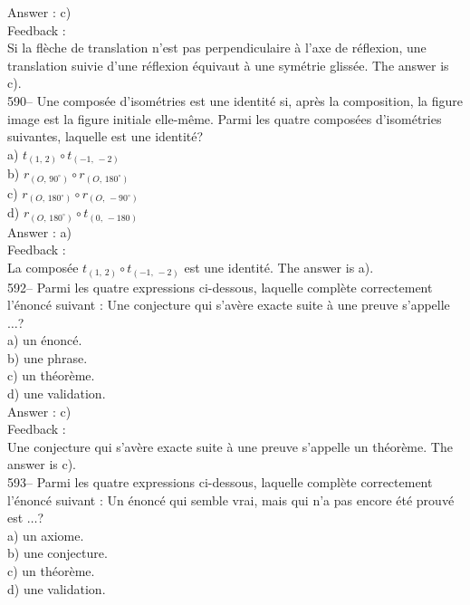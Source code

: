 ﻿\documentclass[letterpaper, 12pt]{article}
\begin{document}
Answer : c)\\

Feedback : \\
Si la fl\`eche de translation n'est pas perpendiculaire \`a l'axe de
r\'eflexion, une translation suivie d'une r\'eflexion  \'equivaut \`a une
sym\'etrie gliss\'ee.  The answer is c).\\

590-- Une compos\'ee d'isom\'etries est une identit\'e si, apr\`es la
composition, la figure image est la figure initiale elle-m\^eme.  Parmi les
quatre compos\'ees d'isom\'etries suivantes, laquelle est une identit\'e?\\
a) $t_{\left(1,\,2\right) } \circ t_{\left(-1,\,-2\right) } $\\
b) $r_{\left(O,\,90^{\circ}\right)} \circ r_{\left(O,\,180^{\circ}\right)}
$\\
c) $r_{\left(O,\,180^{\circ}\right)} \circ r_{\left(O,\,-90^{\circ}\right)}
$\\
d) $r_{\left(O,\,180^{\circ}\right)} \circ t_{\left(0,\,-180\right)} $   \\

Answer : a) \\

Feedback : \\
La compos\'ee $t_{\left(1,\,2\right) } \circ t_{\left(-1,\,-2\right) } $ est
une identit\'e.  The answer is a).\\


592--  Parmi les quatre expressions ci-dessous, laquelle compl\`ete
correctement l'\'enonc\'e suivant : \og Une conjecture qui s'av\`ere
exacte suite \`a une preuve s'appelle $\dots$\fg ?\\
a) un \'enonc\'e.\\
b) une phrase. \\
c) un th\'eor\`eme.\\
d) une validation.\\

Answer : c)\\

Feedback : \\
Une conjecture qui s'av\`ere exacte suite \`a une preuve s'appelle un
th\'eor\`eme.  The answer is c).\\

593-- Parmi les quatre expressions ci-dessous, laquelle compl\`ete
correctement l'\'enonc\'e suivant : \og Un \'enonc\'e qui semble
vrai, mais qui n'a pas encore \'et\'e prouv\'e est $\ldots$\fg ?\\
a) un axiome.\\
b) une conjecture.\\
c) un th\'eor\`eme.\\
d) une validation.\\
\end{document}
